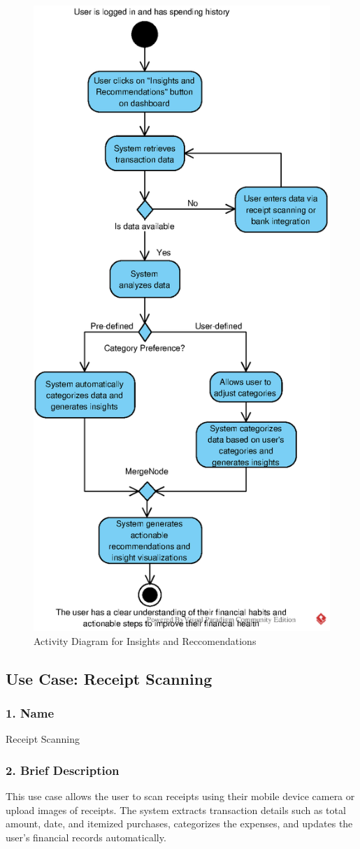 \newpage

\begin{figure}[!h]
    \centering
    \includegraphics[width=0.5\linewidth]{eps/PFPInsights.eps}
    \caption{Activity Diagram for Insights and Reccomendations}
    \label{fig:enter-label}
\end{figure}

\newpage

\subsection*{Use Case: Receipt Scanning}
\begin{useCase}
\end{useCase}

\subsubsection*{1. Name}
Receipt Scanning

\subsubsection*{2. Brief Description}
This use case allows the user to scan receipts using their mobile device camera or upload images of receipts. The system extracts transaction details such as total amount, date, and itemized purchases, categorizes the expenses, and updates the user's financial records automatically.

